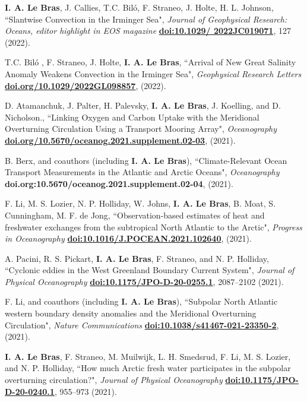 \documentclass[paper=letter,fontsize=11pt]{scrartcl} %
\newcommand{\PaperEntry}[6]{
		\noindent #1, ``#2", \textit{#3} \textbf{#4}, #5 (#6).}
\begin{document}
\begin{etaremune}
\item \PaperEntry{\textbf{I. A. Le Bras}, J. Callies, T.C. Bil\'{o}, F. Straneo, J. Holte, H. L. Johnson}{Slantwise Convection in the Irminger Sea}{Journal of Geophysical Research: Oceans, editor highlight in EOS magazine}{\url{doi:10.1029/ 2022JC019071}}{127}{2022}

\item \PaperEntry{T.C. Bil\'{o} , F. Straneo, J. Holte, \textbf{I. A. Le Bras}}{Arrival of New Great Salinity Anomaly Weakens Convection in the Irminger Sea}{Geophysical Research Letters\\}{\url{doi.org/10.1029/2022GL098857}}{}{2022}

\item \PaperEntry{D. Atamanchuk, J. Palter, H. Palevsky, \textbf{I. A. Le Bras}, J. Koelling, and D. Nicholson.}{Linking Oxygen and Carbon Uptake with the Meridional Overturning Circulation Using a Transport Mooring Array}{Oceanography}{\url{doi.org/10.5670/oceanog.2021.supplement.02-03}}{}{2021}

\item \PaperEntry{B. Berx, and coauthors (including \textbf{I. A. Le Bras})}{Climate-Relevant Ocean Transport Measurements in the Atlantic and Arctic Oceans}{Oceanography}{doi.org:10.5670/oceanog.2021.supplement.02-04}{}{2021}

\item \PaperEntry{F. Li, M. S. Lozier, N. P. Holliday, W. Johns, \textbf{I. A. Le Bras}, B. Moat, S. Cunningham, M. F. de Jong}{Observation-based estimates of heat and freshwater exchanges from the subtropical North Atlantic to the Arctic}{Progress in Oceanography}{\url{doi:10.1016/J.POCEAN.2021.102640}}{}{2021}

\item \PaperEntry{A. Pacini, R. S. Pickart, \textbf{I. A. Le Bras}, F. Straneo, and N. P. Holliday}{Cyclonic eddies in the West Greenland Boundary Current System}{Journal of Physical Oceanography}{\url{doi:10.1175/JPO-D-20-0255.1}}{2087--2102}{2021}


\item \PaperEntry{F. Li, and coauthors (including \textbf{I. A. Le Bras})}{Subpolar North Atlantic western boundary density anomalies and the Meridional Overturning Circulation}{Nature Communications}{\url{doi:10.1038/s41467-021-23350-2}}{}{2021}
\item \PaperEntry{\textbf{I. A. Le Bras}, F. Straneo, M. Muilwijk, L. H. Smedsrud, F. Li, M. S. Lozier, and N. P. Holliday}{How much Arctic fresh water participates in the subpolar overturning circulation?}{Journal of Physical Oceanography}{\url{doi:10.1175/JPO-D-20-0240.1}}{955--973}{2021}


\end{etaremune}
\end{document}
